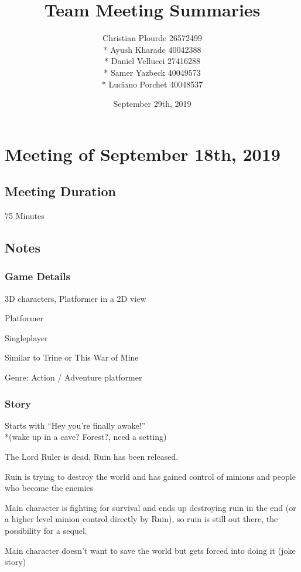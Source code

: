 \documentclass{article}
\begin{document}
\title{Team Meeting Summaries}
\author{Christian Plourde 26572499\\*
		Ayush Kharade 40042388\\*
		Daniel Vellucci 27416288\\*
		Samer Yazbeck 40049573\\*
		Luciano Porchet 40048537
		}
\date{September 29th, 2019}

\maketitle

\newpage

\section{Meeting of September 18th, 2019}

\subsection{Meeting Duration}
75 Minutes

\subsection{Notes}
\subsubsection{Game Details}
\begin{description}
\item 3D characters, Platformer in a 2D view
\item Platformer
\item Singleplayer
\item Similar to Trine or This War of Mine
\item Genre: Action / Adventure platformer
\end{description}

\subsubsection{Story}
\begin{description}
\item Starts with “Hey you're finally awake!”\\*(wake up in a cave? Forest?, need a setting)
\item The Lord Ruler is dead, Ruin has been released.
\item Ruin is trying to destroy the world and has gained control of minions and people who become the enemies
\item Main character is fighting for survival and ends up destroying ruin in the end (or a higher level minion control directly by Ruin), so ruin is still out there, the possibility for a sequel.
\item Main character doesn't want to save the world but gets forced into doing it (joke story) 
\end{description}
\end{document}
